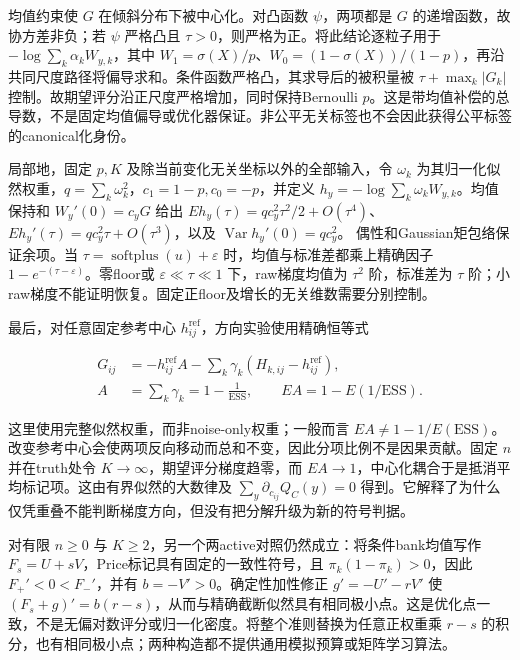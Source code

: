 \documentclass[11pt,a4paper]{article}
\begin{document}
均值约束使 \(G\) 在倾斜分布下被中心化。对凸函数 \(\psi\)，两项都是 \(G\)
的递增函数，故协方差非负；若 \(\psi\) 严格凸且
\(\tau>0\)，则严格为正。将此结论逐粒子用于
\(-\log\sum_k\alpha_kW_{y,k}\)，其中
\(W_1=\sigma(X)/p\)、\(W_0=(1-\sigma(X))/(1-p)\)，再沿共同尺度路径将偏导求和。条件函数严格凸，其求导后的被积量被
\(\tau+\max_k|G_k|\) 控制。故期望评分沿正尺度严格增加，同时保持Bernoulli
\(p\)。这是带均值补偿的总导数，不是固定均值偏导或优化器保证。非公平无关标签也不会因此获得公平标签的canonical化身份。

局部地，固定 \(p,K\) 及除当前变化无关坐标以外的全部输入，令 \(\omega_k\)
为其归一化似然权重，\(q=\sum_k\omega_k^2\)，\(c_1=1-p,c_0=-p\)，并定义
\(h_y=-\log\sum_k\omega_kW_{y,k}\)。均值保持和 \(W_y'(0)=c_yG\) 给出
\(Eh_y(\tau)=q c_y^2\tau^2/2+O(\tau^4)\)、
\(Eh_y'(\tau)=q c_y^2\tau+O(\tau^3)\)，以及
\(\operatorname{Var}h_y'(0)=q c_y^2\)。 偶性和Gaussian矩包络保证余项。当
\(\tau=\operatorname{softplus}(u)+\varepsilon\)
时，均值与标准差都乘上精确因子 \(1-e^{-(\tau-\varepsilon)}\)。零floor或
\(\varepsilon\ll\tau\ll1\) 下，raw梯度均值为 \(\tau^2\) 阶，标准差为
\(\tau\)
阶；小raw梯度不能证明恢复。固定正floor及增长的无关维数需要分别控制。

最后，对任意固定参考中心
\(h_{ij}^{\mathrm{ref}}\)，方向实验使用精确恒等式

\[
\begin{aligned}
G_{ij}&=-h_{ij}^{\mathrm{ref}}A-\sum_k\gamma_k(H_{k,ij}-h_{ij}^{\mathrm{ref}}),\\
A&=\sum_k\gamma_k=1-\frac1{\mathrm{ESS}},\qquad EA=1-E(1/\mathrm{ESS}).
\end{aligned}
\tag{A.31}
\]

这里使用完整似然权重，而非noise-only权重；一般而言
\(EA\ne1-1/E(\mathrm{ESS})\)。改变参考中心会使两项反向移动而总和不变，因此分项比例不是因果贡献。固定
\(n\) 并在truth处令 \(K\to\infty\)，期望评分梯度趋零，而
\(EA\to1\)，中心化耦合于是抵消平均标记项。这由有界似然的大数律及
\(\sum_y\partial_{c_{ij}}Q_C(y)=0\)
得到。它解释了为什么仅凭重叠不能判断梯度方向，但没有把分解升级为新的符号判据。

对有限 \(n\ge0\) 与
\(K\ge2\)，另一个两active对照仍然成立：将条件bank均值写作
\(F_s=U+sV\)，Price标记具有固定的一致性符号，且
\(\pi_k(1-\pi_k)>0\)，因此 \(F_+'<0<F_-'\)，并有
\(b=-V'>0\)。确定性加性修正 \(g'=-U'-rV'\) 使
\((F_s+g)'=b(r-s)\)，从而与精确截断似然具有相同极小点。这是优化点一致，不是无偏对数评分或归一化密度。将整个准则替换为任意正权重乘
\(r-s\)
的积分，也有相同极小点；两种构造都不提供通用模拟预算或矩阵学习算法。
\end{document}
